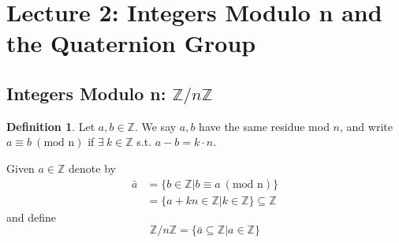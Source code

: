 \documentclass{article}
\theoremstyle{definition}
\newtheorem{definition}{Definition}[section]
\theoremstyle{remark}
\begin{document}
\section{Lecture 2: Integers Modulo n and the Quaternion Group}
\subsection{Integers Modulo n: $\mathbb{Z}/n\mathbb{Z}$}
\begin{definition}
 Let $a,b\in \mathbb{Z}$. We say $a,b$ have the same residue mod $n$, and write $a\equiv b~(\text{mod n})$ if $\exists~k\in \mathbb{Z}$ s.t. $a-b=k\cdot n$.
\end{definition}
Given $a\in \mathbb{Z}$ denote by 
\begin{align*}
\bar{a}&=\lbrace b\in \mathbb{Z}|b\equiv a~ (\text{mod n})\rbrace	\\
&=\lbrace a + kn \in \mathbb{Z}| k\in \mathbb{Z}\rbrace \subseteq \mathbb{Z}
\end{align*}
and define 
\begin{equation}
\mathbb{Z}/n\mathbb{Z}=\lbrace \bar{a} \subseteq \mathbb{Z}|a\in \mathbb{Z}\rbrace
\end{equation}
\end{document}
